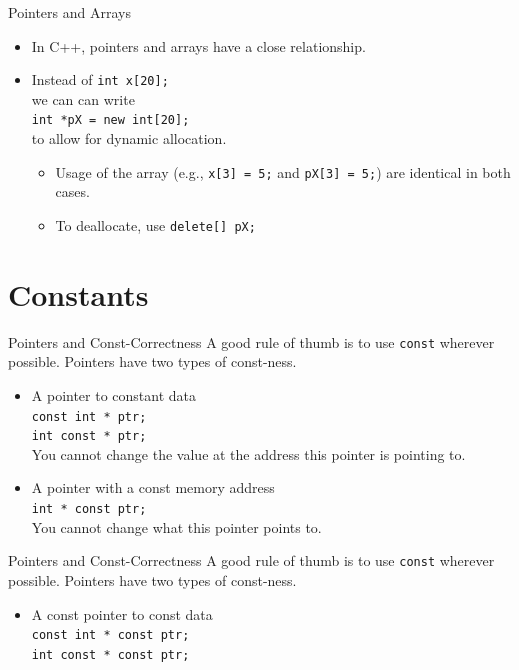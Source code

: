 \documentclass[14pt,aspectratio=1610]{beamer}
\begin{document}
\begin{frame}{Pointers and Arrays}
\begin{itemize}
\item In C++, pointers and arrays have a close relationship.
\item Instead of \lstinline{int x[20];}\\
we can can write \\
\lstinline{int *pX = new int[20];} \\
to allow for dynamic allocation.
\begin{itemize}
\item Usage of the array (e.g., \lstinline{x[3] = 5;} and \lstinline{pX[3] = 5;}) are identical in both cases.
\item To deallocate, use \lstinline{delete[] pX;}
\end{itemize}
\end{itemize}
\end{frame}

\section*{Constants}
\begin{frame}{Pointers and Const-Correctness}
  A good rule of thumb is to use \lstinline{const} wherever possible.
  Pointers have two types of const-ness.
  \begin{itemize}[<+->]
    \item A pointer to constant data\\
      \lstinline{const int * ptr;}\\
      \lstinline{int const * ptr;}\\
      You cannot change the value at the address this pointer is pointing to.
    \item A pointer with a const memory address\\
      \lstinline{int * const ptr;}\\
      You cannot change what this pointer points to.
  \end{itemize}
\end{frame}

\begin{frame}{Pointers and Const-Correctness}
  A good rule of thumb is to use \lstinline{const} wherever possible.
  Pointers have two types of const-ness.
  \begin{itemize}[<+->]
    \item A const pointer to const data\\
      \lstinline{const int * const ptr;}\\
      \lstinline{int const * const ptr;}
  \end{itemize}
\end{frame}
\end{document}
